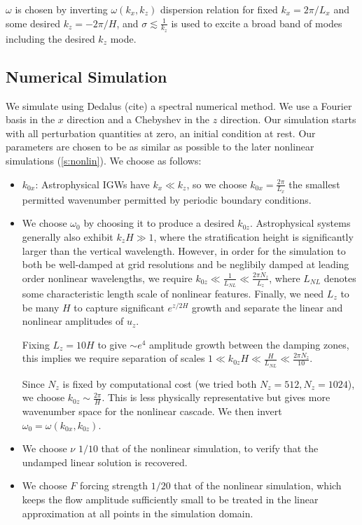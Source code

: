\documentclass[twocolumn,
        usenames, %
        dvipsnames %
    ]{revtex4-1}%
\begin{document}
$\omega$ is chosen by inverting $\omega(k_x, k_z)$ dispersion relation for fixed
$k_x = 2\pi / L_x$ and some desired $k_z = -2\pi/H$, and $\sigma \lesssim
\frac{1}{k_z}$ is used to excite a broad band of modes including the desired
$k_z$ mode.

\subsection{Numerical Simulation}\label{ss:lin_ns}

We simulate using Dedalus (cite) a spectral numerical method. We use a Fourier
basis in the $x$ direction and a Chebyshev in the $z$ direction. Our simulation
starts with all perturbation quantities at zero, an initial condition at rest.
Our parameters are chosen to be as similar as possible to the later nonlinear
simulations (\autoref{s:nonlin}). We choose as follows:
\begin{itemize}
    \item $k_{0x}$: Astrophysical IGWs have $k_x \ll k_z$, so we choose $k_{0x}
        = \frac{2\pi}{L_x}$ the smallest permitted wavenumber permitted by
        periodic boundary conditions.

    \item We choose $\omega_0$ by choosing it to produce a desired $k_{0z}$.
        Astrophysical systems generally also exhibit $k_zH \gg 1$, where the
        stratification height is significantly larger than the vertical
        wavelength. However, in order for the simulation to both be well-damped
        at grid resolutions and be neglibily damped at leading order nonlinear
        wavelengths, we require $k_{0z} \ll \frac{1}{L_{NL}} \ll \frac{2\pi
        N_z}{L_z}$, where $L_{NL}$ denotes some characteristic length scale of
        nonlinear features. Finally, we need $L_z$ to be many $H$ to capture
        significant $e^{z/2H}$ growth and separate the linear and nonlinear
        amplitudes of $u_z$.

        Fixing $L_z = 10H$ to give $\sim e^4$ amplitude growth between the
        damping zones, this implies we require separation of scales $1 \ll
        k_{0z}H \ll \frac{H}{L_{NL}} \ll \frac{2\pi N_z}{10}$.

        Since $N_z$ is fixed by computational cost (we tried both $N_z = 512,
        N_z = 1024$), we choose $k_{0z} \sim \frac{2\pi}{H}$. This is less
        physically representative but gives more wavenumber space for the
        nonlinear cascade. We then invert $\omega_0 = \omega(k_{0x}, k_{0z})$.

    \item We choose $\nu$ $1/10$ that of the nonlinear simulation, to verify
        that the undamped linear solution is recovered.

    \item We choose $F$ forcing strength $1/20$ that of the nonlinear
        simulation, which keeps the flow amplitude sufficiently small to be
        treated in the linear approximation at all points in the simulation
        domain.
\end{itemize}
\end{document}
